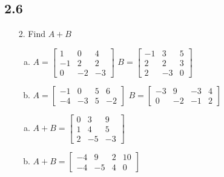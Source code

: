 \subsection{2.6}
\begin{itemize}
   \item[2.] Find $A + B$
         \begin{enumerate}[a.]
            \item
                  $A = \begin{bmatrix}
                        1  & 0  & 4  \\
                        -1 & 2  & 2  \\
                        0  & -2 & -3
                     \end{bmatrix}$
                  $B = \begin{bmatrix}
                        -1 & 3  & 5 \\
                        2  & 2  & 3 \\
                        2  & -3 & 0
                     \end{bmatrix}$
            \item
                  $A = \begin{bmatrix}
                        -1 & 0  & 5 & 6  \\
                        -4 & -3 & 5 & -2
                     \end{bmatrix}$
                  $B = \begin{bmatrix}
                        -3 & 9  & -3 & 4 \\
                        0  & -2 & -1 & 2
                     \end{bmatrix}$
         \end{enumerate}
         \answer
         \begin{enumerate}[a.]
            \item
                  $A + B =  \begin{bmatrix}
                        0 & 3  & 9  \\
                        1 & 4  & 5  \\
                        2 & -5 & -3
                     \end{bmatrix}$
            \item
                  $A + B = \begin{bmatrix}
                        -4 & 9  & 2 & 10 \\
                        -4 & -5 & 4 & 0
                     \end{bmatrix}$

\end{enumerate}
\end{itemize}
